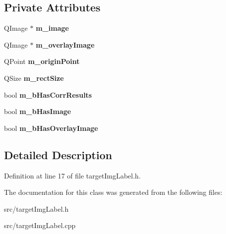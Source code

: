 \subsection*{Private Attributes}
\begin{DoxyCompactItemize}
\item 
\hypertarget{classTargetImgLabel_ae532d541556a3647cff5a83bcf1306c3}{
QImage $\ast$ {\bfseries m\_\-image}}
\label{classTargetImgLabel_ae532d541556a3647cff5a83bcf1306c3}

\item 
\hypertarget{classTargetImgLabel_a94cf2b5841057d54bf3172aa2fef1e83}{
QImage $\ast$ {\bfseries m\_\-overlayImage}}
\label{classTargetImgLabel_a94cf2b5841057d54bf3172aa2fef1e83}

\item 
\hypertarget{classTargetImgLabel_a0ed69ba29f03494cdd3ec22d9df4e15f}{
QPoint {\bfseries m\_\-originPoint}}
\label{classTargetImgLabel_a0ed69ba29f03494cdd3ec22d9df4e15f}

\item 
\hypertarget{classTargetImgLabel_ae9e4109bdd7a8a6b5d0bd59850c6abba}{
QSize {\bfseries m\_\-rectSize}}
\label{classTargetImgLabel_ae9e4109bdd7a8a6b5d0bd59850c6abba}

\item 
\hypertarget{classTargetImgLabel_a34a2b6061eb38412b7f7e88fbf741c2f}{
bool {\bfseries m\_\-bHasCorrResults}}
\label{classTargetImgLabel_a34a2b6061eb38412b7f7e88fbf741c2f}

\item 
\hypertarget{classTargetImgLabel_a3b0b34d9c2f7c4f6c9aea8bc75d91d99}{
bool {\bfseries m\_\-bHasImage}}
\label{classTargetImgLabel_a3b0b34d9c2f7c4f6c9aea8bc75d91d99}

\item 
\hypertarget{classTargetImgLabel_a1c34173d16f00af22f7db9e1bb3e7b30}{
bool {\bfseries m\_\-bHasOverlayImage}}
\label{classTargetImgLabel_a1c34173d16f00af22f7db9e1bb3e7b30}

\end{DoxyCompactItemize}


\subsection{Detailed Description}


Definition at line 17 of file targetImgLabel.h.

The documentation for this class was generated from the following files:\begin{DoxyCompactItemize}
\item 
src/targetImgLabel.h\item 
src/targetImgLabel.cpp\end{DoxyCompactItemize}
